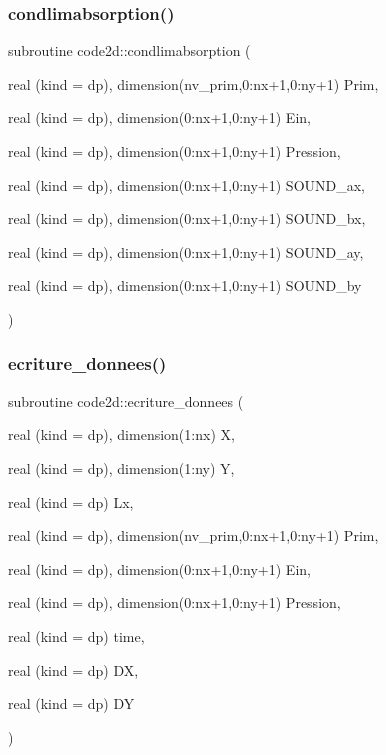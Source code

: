 \mbox{\label{main2Dv1_01_07copy_08_8f90_a4fa8d6d2b6084471f67e67e44694e3a7}} 
\subsubsection{\texorpdfstring{condlimabsorption()}{condlimabsorption()}}
{\footnotesize\ttfamily subroutine code2d\+::condlimabsorption (\begin{DoxyParamCaption}\item[{real (kind = dp), dimension(nv\+\_\+prim,0\+:nx+1,0\+:ny+1)}]{Prim,  }\item[{real (kind = dp), dimension(0\+:nx+1,0\+:ny+1)}]{Ein,  }\item[{real (kind = dp), dimension(0\+:nx+1,0\+:ny+1)}]{Pression,  }\item[{real (kind = dp), dimension(0\+:nx+1,0\+:ny+1)}]{S\+O\+U\+N\+D\+\_\+ax,  }\item[{real (kind = dp), dimension(0\+:nx+1,0\+:ny+1)}]{S\+O\+U\+N\+D\+\_\+bx,  }\item[{real (kind = dp), dimension(0\+:nx+1,0\+:ny+1)}]{S\+O\+U\+N\+D\+\_\+ay,  }\item[{real (kind = dp), dimension(0\+:nx+1,0\+:ny+1)}]{S\+O\+U\+N\+D\+\_\+by }\end{DoxyParamCaption})}

\mbox{\label{main2Dv1_01_07copy_08_8f90_aff02bfa8466e376e08fed7a99aae4039}} 
\subsubsection{\texorpdfstring{ecriture\+\_\+donnees()}{ecriture\_donnees()}}
{\footnotesize\ttfamily subroutine code2d\+::ecriture\+\_\+donnees (\begin{DoxyParamCaption}\item[{real (kind = dp), dimension(1\+:nx)}]{X,  }\item[{real (kind = dp), dimension(1\+:ny)}]{Y,  }\item[{real (kind = dp)}]{Lx,  }\item[{real (kind = dp), dimension(nv\+\_\+prim,0\+:nx+1,0\+:ny+1)}]{Prim,  }\item[{real (kind = dp), dimension(0\+:nx+1,0\+:ny+1)}]{Ein,  }\item[{real (kind = dp), dimension(0\+:nx+1,0\+:ny+1)}]{Pression,  }\item[{real (kind = dp)}]{time,  }\item[{real (kind = dp)}]{DX,  }\item[{real (kind = dp)}]{DY }\end{DoxyParamCaption})}

